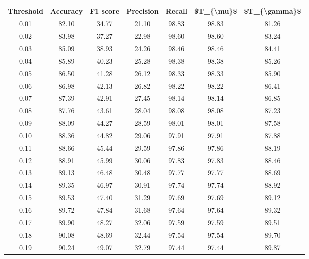 \begin{tabular}{|c|c|c|c|c|c|c|}
\hline
 Threshold &  Accuracy &  F1 score &  Precision &  Recall &  \$T\_\{\textbackslash mu\}\$ &  \$T\_\{\textbackslash gamma\}\$ \\
\hline
      0.01 &     82.10 &     34.77 &      21.10 &   98.83 &      98.83 &         81.26 \\
      0.02 &     83.98 &     37.27 &      22.98 &   98.60 &      98.60 &         83.24 \\
      0.03 &     85.09 &     38.93 &      24.26 &   98.46 &      98.46 &         84.41 \\
      0.04 &     85.89 &     40.23 &      25.28 &   98.38 &      98.38 &         85.26 \\
      0.05 &     86.50 &     41.28 &      26.12 &   98.33 &      98.33 &         85.90 \\
      0.06 &     86.98 &     42.13 &      26.82 &   98.22 &      98.22 &         86.41 \\
      0.07 &     87.39 &     42.91 &      27.45 &   98.14 &      98.14 &         86.85 \\
      0.08 &     87.76 &     43.61 &      28.04 &   98.08 &      98.08 &         87.23 \\
      0.09 &     88.09 &     44.27 &      28.59 &   98.01 &      98.01 &         87.58 \\
      0.10 &     88.36 &     44.82 &      29.06 &   97.91 &      97.91 &         87.88 \\
      0.11 &     88.66 &     45.44 &      29.59 &   97.86 &      97.86 &         88.19 \\
      0.12 &     88.91 &     45.99 &      30.06 &   97.83 &      97.83 &         88.46 \\
      0.13 &     89.13 &     46.48 &      30.48 &   97.77 &      97.77 &         88.69 \\
      0.14 &     89.35 &     46.97 &      30.91 &   97.74 &      97.74 &         88.92 \\
      0.15 &     89.53 &     47.40 &      31.29 &   97.69 &      97.69 &         89.12 \\
      0.16 &     89.72 &     47.84 &      31.68 &   97.64 &      97.64 &         89.32 \\
      0.17 &     89.90 &     48.27 &      32.06 &   97.59 &      97.59 &         89.51 \\
      0.18 &     90.08 &     48.69 &      32.44 &   97.54 &      97.54 &         89.70 \\
      0.19 &     90.24 &     49.07 &      32.79 &   97.44 &      97.44 &         89.87 \\

\end{tabular}
